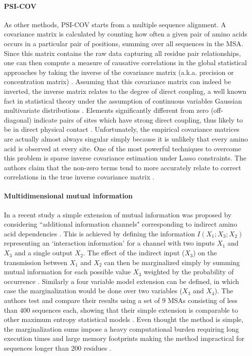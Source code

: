 \paragraph{PSI-COV}
As other methods, PSI-COV \cite{jones2012psicov} starts from a multiple sequence alignment.
A covariance matrix is calculated by counting how often a given pair of amino acids occurs in a particular pair of positions, summing over all sequences in the MSA.
Since this matrix contains the raw data capturing all residue pair relationships, one can then compute a measure of causative correlations in the global statistical approaches by taking the inverse of the covariance matrix (a.k.a. precision or concentration matrix) \cite{jones2012psicov, marks2012protein}.
Assuming that this covariance matrix can indeed be inverted, the inverse matrix relates to the degree of direct coupling, a well known fact in statistical theory under the assumption of continuous variables Gaussian multivariate distributions \cite{marks2012protein}.
Elements significantly different from zero (off-diagonal) indicate pairs of sites which have strong direct coupling, thus likely to be in direct physical contact \cite{jones2012psicov}.
Unfortunately, the empirical covariance matrices are actually almost always singular simply because it is unlikely that every amino acid is observed at every site.
One of the most powerful techniques to overcome this problem is sparse inverse covariance estimation under Lasso constraints.
The authors claim that the non-zero terms tend to more accurately relate to correct correlations in the true inverse covariance matrix \cite{jones2012psicov}.

\paragraph{Multidimensional mutual information}
In a recent study a simple extension of mutual information was proposed by considering ``additional information channels" corresponding to indirect
amino acid dependencies \cite{clark2014multidimensional}.
This is achieved by defining the information $I(X_1 ; X_3 ; X_2)$ representing an `interaction information' for a channel with two inputs $X_1$ and $X_3$ and a single output $X_2$.
The effect of the indirect input ($X_3$) on the transmission between $X_1$ and $X_2$ can then be marginalized simply by summing mutual information for each possible value $X_3$ weighted by the probability of occurrence \cite{clark2014multidimensional}.
Similarly a four variable model extension can be defined, in which case the marginalization would be done over two variables ($X_3$ and $X_4$).
The authors test and compare their results using a set of $9$ MSAs consisting of less than $400$ sequences each, showing that their simple extension is comparable to other maximum entropy statistical models \cite{clark2014multidimensional}.
Even thought the method is simple, the marginalization sums impose a heavy computational burden requiring long execution times and large memory footprints making the method impractical for sequences longer than 200 residues \cite{clark2014multidimensional}.

